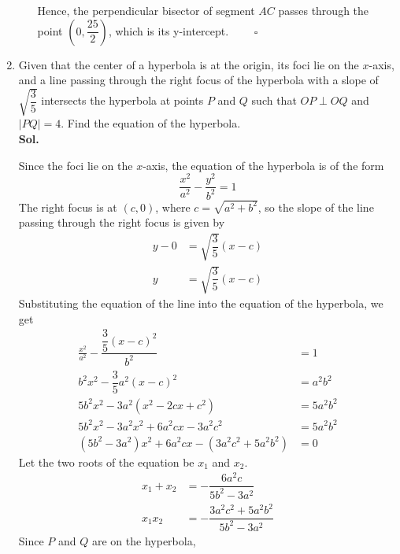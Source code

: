 \documentclass{report}
\newcommand{\sol}{\vspace{1em}\\\textbf{Sol.}}
\newcommand{\eos}{ \qquad \square}
\begin{document}
\begin{enumerate}
\begin{enumerate}
                    Hence, the perpendicular bisector of segment $AC$ passes through the point
                    $\left(0, \dfrac{25}{2}\right)$, which is its y-intercept. $\eos$
          \end{enumerate}

    \item Given that the center of a hyperbola is at the origin, its foci lie on the
          $x$-axis, and a line passing through the right focus of the hyperbola with a
          slope of $\sqrt{\dfrac{3}{5}}$ intersects the hyperbola at points $P$ and $Q$
          such that $OP \perp OQ$ and $|PQ|=4$. Find the equation of the hyperbola.
          \sol{}

          Since the foci lie on the $x$-axis, the equation of the hyperbola is of the
          form
          \begin{equation*}
              \frac{x^2}{a^2} - \frac{y^2}{b^2} = 1
          \end{equation*}
          The right focus is at $(c, 0)$, where $c = \sqrt{a^2 + b^2}$, so the slope of the line passing through the right focus is given by
          \begin{align*}
              y - 0 & = \sqrt{\dfrac{3}{5}}(x - c) \\
              y     & = \sqrt{\dfrac{3}{5}}(x - c)
          \end{align*}
          Substituting the equation of the line into the equation of the hyperbola, we get
          \begin{align*}
              \frac{x^2}{a^2} - \dfrac{\dfrac{3}{5}(x - c)^2}{b^2} & = 1       \\
              b^2x^2 - \dfrac{3}{5}a^2(x - c)^2                    & = a^2b^2  \\
              5b^2x^2 - 3a^2(x^2 - 2cx + c^2)                      & = 5a^2b^2 \\
              5b^2x^2 - 3a^2x^2 + 6a^2cx - 3a^2c^2                 & = 5a^2b^2 \\
              (5b^2 - 3a^2)x^2 + 6a^2cx - (3a^2c^2 + 5a^2b^2)      & = 0
          \end{align*}
          Let the two roots of the equation be $x_1$ and $x_2$.
          \begin{align*}
              x_1 + x_2 & = -\dfrac{6a^2c}{5b^2 - 3a^2}             \\
              x_1x_2    & = -\dfrac{3a^2c^2 + 5a^2b^2}{5b^2 - 3a^2}
          \end{align*}
          Since $P$ and $Q$ are on the hyperbola,

\end{enumerate}
\end{document}
